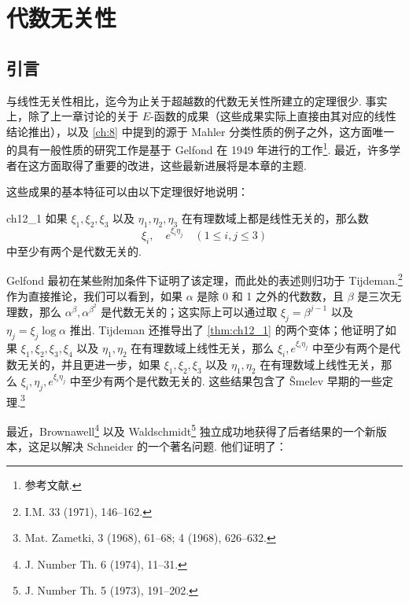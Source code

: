 
\chapter{代数无关性}\label{ch:12}

\section{引言}

与线性无关性相比，迄今为止关于超越数的代数无关性所建立的定理很少. 事实上，除了上一章讨论的关于 $E$-函数的成果（这些成果实际上直接由其对应的线性结论推出），以及 \autoref{ch:8} 中提到的源于 Mahler 分类性质的例子之外，这方面唯一的具有一般性质的研究工作是基于 Gelfond 在 1949 年进行的工作\footnote{参考文献.}. 最近，许多学者在这方面取得了重要的改进，这些最新进展将是本章的主题.

这些成果的基本特征可以由以下定理很好地说明：

\begin{mythm}{}{ch12_1}
如果 $\xi_1, \xi_2, \xi_3$ 以及 $\eta_1, \eta_2, \eta_3$ 在有理数域上都是线性无关的，那么数
\[\xi_i, \quad e^{\xi_i \eta_j} \quad (1 \leq i, j \leq 3)\]
中至少有两个是代数无关的.
\end{mythm}

Gelfond 最初在某些附加条件下证明了该定理，而此处的表述则归功于 Tijdeman.\footnote{I.M. 33 (1971), 146--162.} 作为直接推论，我们可以看到，如果 $\alpha$ 是除 0 和 1 之外的代数数，且 $\beta$ 是三次无理数，那么 $\alpha^{\beta}, \alpha^{\beta^2}$ 是代数无关的；这实际上可以通过取 $\xi_j = \beta^{j-1}$ 以及 $\eta_j = \xi_j \log \alpha$ 推出. Tijdeman 还推导出了 \autoref{thm:ch12_1} 的两个变体；他证明了如果 $\xi_1, \xi_2, \xi_3, \xi_4$ 以及 $\eta_1, \eta_2$ 在有理数域上线性无关，那么 $\xi_i, e^{\xi_i \eta_j}$ 中至少有两个是代数无关的，并且更进一步，如果 $\xi_1, \xi_2, \xi_3$ 以及 $\eta_1, \eta_2$ 在有理数域上线性无关，那么 $\xi_i, \eta_j, e^{\xi_i \eta_j}$ 中至少有两个是代数无关的. 这些结果包含了 \v{S}melev 早期的一些定理.\footnote{Mat. Zametki, 3 (1968), 61--68; 4 (1968), 626--632.}

最近，Brownawell\footnote{J. Number Th. 6 (1974), 11--31.} 以及 Waldschmidt\footnote{J. Number Th. 5 (1973), 191--202.} 独立成功地获得了后者结果的一个新版本，这足以解决 Schneider 的一个著名问题. 他们证明了：

